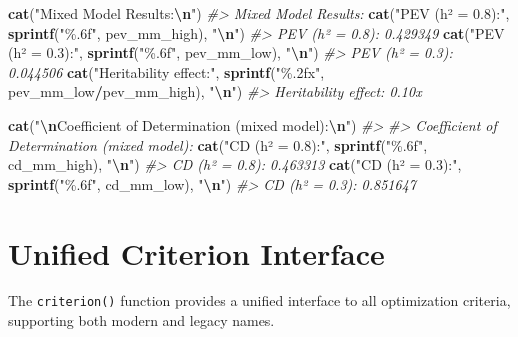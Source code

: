\documentclass[
]{article}
\newenvironment{Shaded}{\begin{snugshade}}{\end{snugshade}}
\newcommand{\CommentTok}[1]{\textcolor[rgb]{0.56,0.35,0.01}{\textit{#1}}}
\newcommand{\FunctionTok}[1]{\textcolor[rgb]{0.13,0.29,0.53}{\textbf{#1}}}
\newcommand{\NormalTok}[1]{#1}
\newcommand{\SpecialCharTok}[1]{\textcolor[rgb]{0.81,0.36,0.00}{\textbf{#1}}}
\newcommand{\StringTok}[1]{\textcolor[rgb]{0.31,0.60,0.02}{#1}}
\begin{document}
\begin{Shaded}
\begin{Highlighting}[]
\FunctionTok{cat}\NormalTok{(}\StringTok{"Mixed Model Results:}\SpecialCharTok{\textbackslash{}n}\StringTok{"}\NormalTok{)}
\CommentTok{\#\textgreater{} Mixed Model Results:}
\FunctionTok{cat}\NormalTok{(}\StringTok{"PEV (h² = 0.8):"}\NormalTok{, }\FunctionTok{sprintf}\NormalTok{(}\StringTok{"\%.6f"}\NormalTok{, pev\_mm\_high), }\StringTok{"}\SpecialCharTok{\textbackslash{}n}\StringTok{"}\NormalTok{)}
\CommentTok{\#\textgreater{} PEV (h² = 0.8): 0.429349}
\FunctionTok{cat}\NormalTok{(}\StringTok{"PEV (h² = 0.3):"}\NormalTok{, }\FunctionTok{sprintf}\NormalTok{(}\StringTok{"\%.6f"}\NormalTok{, pev\_mm\_low), }\StringTok{"}\SpecialCharTok{\textbackslash{}n}\StringTok{"}\NormalTok{)}
\CommentTok{\#\textgreater{} PEV (h² = 0.3): 0.044506}
\FunctionTok{cat}\NormalTok{(}\StringTok{"Heritability effect:"}\NormalTok{, }\FunctionTok{sprintf}\NormalTok{(}\StringTok{"\%.2fx"}\NormalTok{, pev\_mm\_low}\SpecialCharTok{/}\NormalTok{pev\_mm\_high), }\StringTok{"}\SpecialCharTok{\textbackslash{}n}\StringTok{"}\NormalTok{)}
\CommentTok{\#\textgreater{} Heritability effect: 0.10x}

\FunctionTok{cat}\NormalTok{(}\StringTok{"}\SpecialCharTok{\textbackslash{}n}\StringTok{Coefficient of Determination (mixed model):}\SpecialCharTok{\textbackslash{}n}\StringTok{"}\NormalTok{)}
\CommentTok{\#\textgreater{} }
\CommentTok{\#\textgreater{} Coefficient of Determination (mixed model):}
\FunctionTok{cat}\NormalTok{(}\StringTok{"CD (h² = 0.8):"}\NormalTok{, }\FunctionTok{sprintf}\NormalTok{(}\StringTok{"\%.6f"}\NormalTok{, cd\_mm\_high), }\StringTok{"}\SpecialCharTok{\textbackslash{}n}\StringTok{"}\NormalTok{)}
\CommentTok{\#\textgreater{} CD (h² = 0.8): 0.463313}
\FunctionTok{cat}\NormalTok{(}\StringTok{"CD (h² = 0.3):"}\NormalTok{, }\FunctionTok{sprintf}\NormalTok{(}\StringTok{"\%.6f"}\NormalTok{, cd\_mm\_low), }\StringTok{"}\SpecialCharTok{\textbackslash{}n}\StringTok{"}\NormalTok{)}
\CommentTok{\#\textgreater{} CD (h² = 0.3): 0.851647}
\end{Highlighting}
\end{Shaded}

\section{Unified Criterion Interface}\label{unified-criterion-interface}

The \texttt{criterion()} function provides a unified interface to all
optimization criteria, supporting both modern and legacy names.
\end{document}

